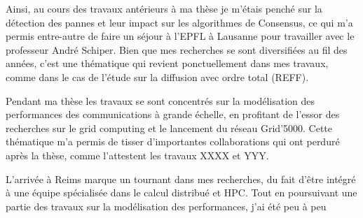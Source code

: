 
Ainsi, au cours des travaux antérieurs à ma thèse je m'étais penché sur la détection des pannes et leur impact sur les algorithmes de Consensus, ce qui m'a permis entre-autre de faire un séjour à l'EPFL à Lausanne pour travailler avec le professeur André Schiper. Bien que mes recherches se sont diversifiées au fil des années, c'est une thématique qui revient ponctuellement dans mes travaux, comme dans le cas de l'étude sur la diffusion avec ordre total (REFF).

Pendant ma thèse les travaux se sont concentrés sur la modélisation des performances des communications à grande échelle, en profitant de l'essor des recherches sur le grid computing et le lancement du réseau Grid'5000. Cette thématique m'a permis de tisser d'importantes collaborations qui ont perduré après la thèse, comme l'attestent les travaux XXXX et YYY.

L'arrivée à Reims marque un tournant dans mes recherches, du fait d'être intégré à une équipe spécialisée dans le calcul distribué et HPC. Tout en poursuivant une partie des travaux sur la modélisation des performances, j'ai été peu à peu  

